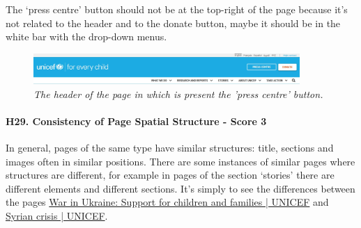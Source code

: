 \newline The ‘press centre’ button should not be at the top-right of the page because it’s not related to the header and to the donate button, maybe it should be in the white bar with the drop-down menus.
\begin{figure}[h]
	\begin{center}
		\includegraphics[width=0.9\textwidth]{FinalScores32.jpg}
		\captionsetup{font=small}
		\caption{\textit{The header of the page in which is present the 'press centre' button.}}
	\end{center}
\end{figure}
\newline
\newline \paragraph{H29. Consistency of Page Spatial Structure - Score 3} \label{subsec:H29}	In general, pages of the same type have similar structures: title, sections and images often in similar positions. There are some instances of similar pages where structures are different, for example in pages of the section ‘stories’ there are different elements and different sections.
\newline It’s simply to see the differences between the pages \href{https://www.unicef.org/emergencies/war-ukraine-pose-immediate-threat-children}{War in Ukraine: Support for children and families | UNICEF} and \href{https://www.unicef.org/emergencies/syrian-crisis}{Syrian crisis | UNICEF}.




















